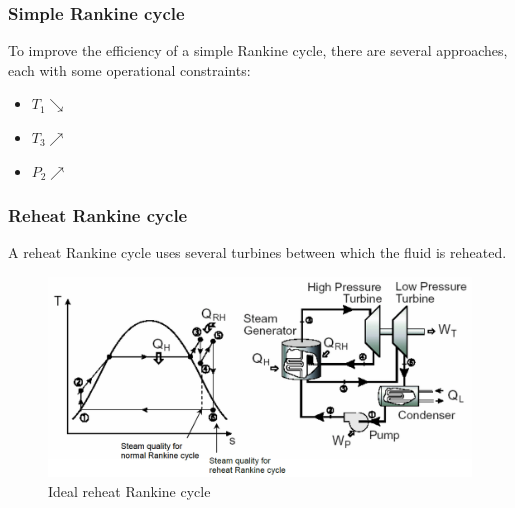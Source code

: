 \documentclass[10pt, twocolumn]{article}
\begin{document}
\subsubsection{Simple Rankine cycle}
To improve the efficiency of a simple Rankine cycle, there are several approaches, each with some operational constraints:
\begin{itemize}
  \item \(T_1 \searrow\)
  \item \(T_3 \nearrow\)
  \item \(P_2 \nearrow\)
\end{itemize}


\subsubsection{Reheat Rankine cycle}
A reheat Rankine cycle uses several turbines between which the fluid is reheated.
\begin{figure}[ht] %
  \centering
  \caption{Ideal reheat Rankine cycle}
  \label{fig:ideal-reheat-Rankine}
  \includegraphics[width = 0.9\linewidth]{../../images/mech/mech-351/ideal-reheat-Rankine-cycle.png}
\end{figure}
\end{document}

